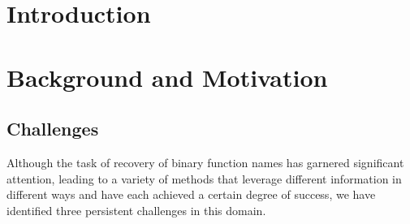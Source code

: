\documentclass[acmsmall,screen,review,anonymous]{acmart} %
\begin{document}


\maketitle


\section{Introduction}



\section{Background and Motivation}



\subsection{Challenges}
Although the task of recovery of binary function names has garnered significant attention, leading to a variety of methods that leverage different information in different ways and have each achieved a certain degree of success, we have identified three persistent challenges in this domain.
\end{document}
